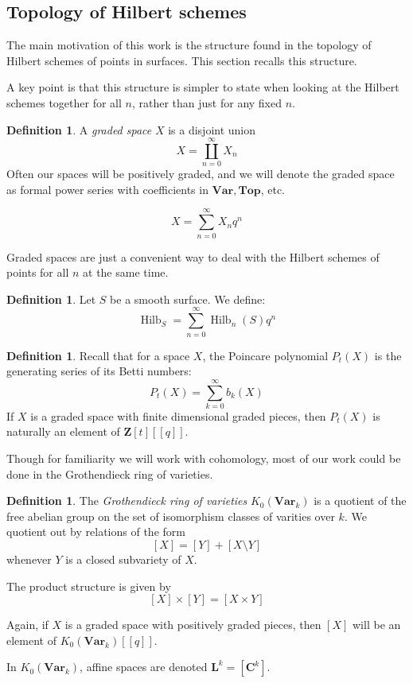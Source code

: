 \documentclass{amsart}[12pt]
\theoremstyle{definition}
\newtheorem{definition}[dummy]{Definition}
\newcommand{\Z}{\mathbf{Z}}
\newcommand{\C}{\mathbf{C}}
\newcommand{\LL}{\mathbf{L}}
\newcommand{\Var}{\mathbf{Var}}
\newcommand{\Top}{\mathbf{Top}}
\DeclareMathOperator{\Hilb}{Hilb}
\newcommand{\HG}{\Hilb}
\begin{document}
\subsection{Topology of Hilbert schemes}


The main motivation of this work is the structure found in the topology of Hilbert schemes of points in surfaces.  This section recalls this structure.

A key point is that this structure is simpler to state when looking at the Hilbert schemes together for all $n$, rather than just for any fixed $n$.  

\begin{definition}
A \emph{graded space} $X$ is a disjoint union $$X=\coprod_{n=0}^\infty X_n$$
Often our spaces will be positively graded, and we will denote the graded space as formal power series with coefficients in $\Var, \Top$, etc.

$$X=\sum_{n=0}^\infty X_nq^n$$
\end{definition}


Graded spaces are just a convenient way to deal with the Hilbert schemes of points for all $n$ at the same time.
\begin{definition}
Let $S$ be a smooth surface.  We define:
$$\HG_S=\sum_{n=0}^\infty \Hilb_n(S)q^n$$
\end{definition}

\begin{definition}
Recall that for a space $X$, the Poincare polynomial $P_t(X)$ is the generating series of its Betti numbers:
$$P_t(X)=\sum_{k=0}^\infty b_k(X)$$
If $X$ is a graded space with finite dimensional graded pieces, then $P_t(X)$ is naturally an element of $\Z[t][[q]]$.
\end{definition}
 
Though for familiarity we will work with cohomology, most of our work could be done in the Grothendieck ring of varieties.



\begin{definition}
The \emph{Grothendieck ring of varieties} $K_0(\Var_k)$ is a quotient of the free abelian group on the set of isomorphism classes of varities over $k$.  We quotient out by relations of the form
$$[X]=[Y]+[X\setminus Y]$$
whenever $Y$ is a closed subvariety of $X$.   

The product structure is given by
$$[X]\times [Y]=[X\times Y]$$

Again, if $X$ is a graded space with positively graded pieces, then $[X]$ will be an element of $K_0(\Var_k)[[q]]$.

In $K_0(\Var_k)$, affine spaces are denoted $\LL^k=[\C^k]$.

\end{definition}
\end{document}
